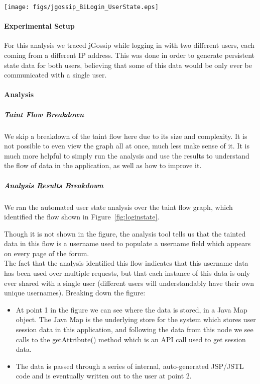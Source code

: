 \documentclass[msc,oneside]{ubcthesis}
\begin{document}
\begin{sidewaysfigure}
\centering
\scalebox{0.44}
{\texttt{[image: figs/jgossip\_BiLogin\_UserState.eps]}}
\caption{jGossip Login User State Analysis Results} 
\label{fig:loginstate}
\end{sidewaysfigure}

\paragraph{Experimental Setup}
For this analysis we traced jGossip while logging in with two different users, each coming from a different IP address. This was done in order to generate persistent state data for both users, believing that some of this data would be only ever be communicated with a single user.

\paragraph{Analysis}
\subparagraph{Taint Flow Breakdown}
We skip a breakdown of the taint flow here due to its size and complexity. It is not possible to even view the graph all at once, much less make sense of it. It is much more helpful to simply run the analysis and use the results to understand the flow of data in the application, as well as how to improve it.

\subparagraph{Analysis Results Breakdown}
We ran the automated user state analysis over the taint flow graph, which identified the flow shown in Figure~\ref{fig:loginstate}. 

Though it is not shown in the figure, the analysis tool tells us that the tainted data in this flow is a username used to populate a username field which appears on every page of the forum.\\

The fact that the analysis identified this flow indicates that this username data has been used over multiple requests, but that each instance of this data is only ever shared with a single user (different users will understandably have their own unique usernames). Breaking down the figure: 

\begin{itemize}
\item At point 1 in the figure we can see where the data is stored, in a Java Map object. The Java Map is the underlying store for the system which stores user session data in this application, and following the data from this node we see calls to the getAttribute() method which is an API call used to get session data.
\item The data is passed through a series of internal, auto-generated JSP/JSTL code and is eventually written out to the user at point 2.
\end{itemize}
\end{document}
